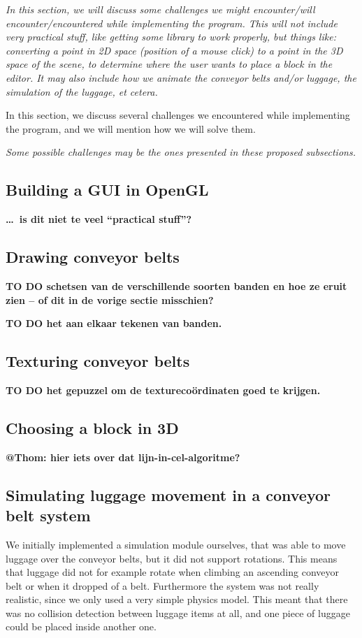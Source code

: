 \textit{In this section, we will discuss some challenges we might encounter/will encounter/encountered while implementing the program. This will not include very practical stuff, like getting some library to work properly, but things like: converting a point in 2D space (position of a mouse click) to a point in the 3D space of the scene, to determine where the user wants to place a block in the editor. It may also include how we animate the conveyor belts and/or luggage, the simulation of the luggage, et cetera.}

In this section, we discuss several challenges we encountered while implementing the program, and we will mention how we will solve them.

\textit{Some possible challenges may be the ones presented in these proposed subsections.}

\subsection{Building a GUI in OpenGL}
\textbf{\ldots\ is dit niet te veel ``practical stuff''?}

\subsection{Drawing conveyor belts}
\textbf{TO DO schetsen van de verschillende soorten banden en hoe ze eruit zien -- of dit in de vorige sectie misschien?}

\textbf{TO DO het aan elkaar tekenen van banden.}

\subsection{Texturing conveyor belts}
\textbf{TO DO het gepuzzel om de textureco\"ordinaten goed te krijgen.}

\subsection{Choosing a block in 3D}
\textbf{@Thom: hier iets over dat lijn-in-cel-algoritme?}

\subsection{Simulating luggage movement in a conveyor belt system}
We initially implemented a simulation module ourselves, that was able to move luggage over the conveyor belts, but it did not support rotations. This means that luggage did not for example rotate when climbing an ascending conveyor belt or when it dropped of a belt. Furthermore the system was not really realistic, since we only used a very simple physics model. This meant that there was no collision detection between luggage items at all, and one piece of luggage could be placed inside another one.

